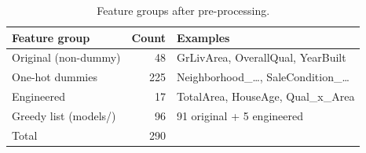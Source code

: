 \begin{table}[t]
\centering
\small
\begin{tabular}{lrl}
\toprule
Feature group & Count & Examples \\
\midrule
Original (non-dummy) & 48 & GrLivArea, OverallQual, YearBuilt \\
One-hot dummies & 225 & Neighborhood\_…, SaleCondition\_… \\
Engineered & 17 & TotalArea, HouseAge, Qual\_x\_Area \\
Greedy list (models/) & 96 & 91 original + 5 engineered \\
Total & 290 &  \\
\bottomrule
\end{tabular}
\caption{Feature groups after pre-processing.}
\label{tab:features}
\end{table}
